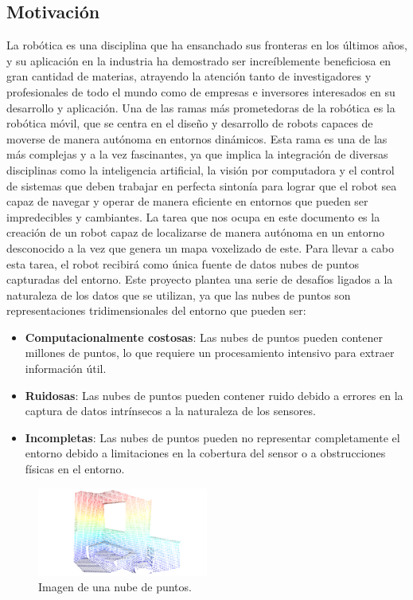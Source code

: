 \documentclass[12pt, a4paper, twoside]{article}
\begin{document}
\subsection{Motivación}
La robótica es una disciplina que ha ensanchado sus fronteras en los últimos años, y su aplicación en la industria ha demostrado ser 
increíblemente beneficiosa en gran cantidad de materias, atrayendo la atención tanto de investigadores y profesionales de todo el 
mundo como de empresas e inversores interesados en su desarrollo y aplicación. \newline
Una de las ramas más prometedoras de la robótica es la robótica móvil, que se centra en el diseño y desarrollo de robots capaces 
de moverse de manera autónoma en entornos dinámicos. Esta rama es una de las más complejas y a la vez fascinantes, ya que implica 
la integración de diversas disciplinas como la inteligencia artificial, la visión por computadora y el control de sistemas que 
deben trabajar en perfecta sintonía para lograr que el robot sea capaz de navegar y operar de manera eficiente en entornos que 
pueden ser impredecibles y cambiantes. \newline
La tarea que nos ocupa en este documento es la creación de un robot capaz de localizarse de manera autónoma en un entorno 
desconocido a la vez que genera un mapa voxelizado de este. Para llevar a cabo esta tarea, el robot recibirá como única fuente 
de datos nubes de puntos capturadas del entorno. \newline
Este proyecto plantea una serie de desafíos ligados a la naturaleza de los datos que se utilizan, ya que las nubes de puntos son 
representaciones tridimensionales del entorno que pueden ser:  
\begin{itemize}
  \item  \textbf{Computacionalmente costosas}: 
    Las nubes de puntos pueden contener millones de puntos, lo que requiere un procesamiento intensivo para extraer información útil.
  \item  \textbf{Ruidosas}:
    Las nubes de puntos pueden contener ruido debido a errores en la captura de datos intrínsecos a la naturaleza de los sensores.
  \item  \textbf{Incompletas}:
    Las nubes de puntos pueden no representar completamente el entorno debido a limitaciones en la cobertura del sensor o a 
    obstrucciones físicas en el entorno.
\end{itemize}
\begin{figure}[h]
  \centering
    \includegraphics[width=0.5\textwidth]{Point_cloud_example.png}
  \caption{Imagen de una nube de puntos.}
\end{figure}
\end{document}
